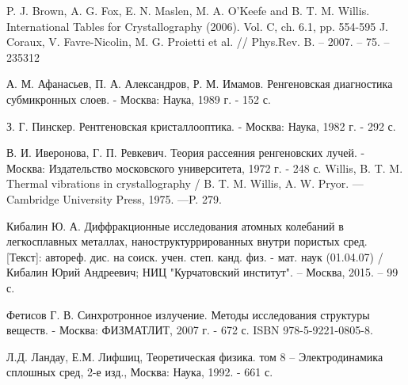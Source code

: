 \begin{thebibliography}{99}

  P. J. Brown, A. G. Fox, E. N. Maslen, M. A. O'Keefe and B. T. M. Willis.
  International Tables for Crystallography (2006). Vol. C, ch. 6.1, pp. 554-595
J. Coraux, V. Favre-Nicolin, M. G. Proietti et al. // Phys.Rev. B. – 2007. – 75. – 235312

  А. М. Афанасьев, П. А. Александров, Р. М. Имамов. Ренгеновская диагностика
  субмикронных слоев. - Москва: Наука, 1989 г. - 152 с.

  З. Г.  Пинскер. Рентгеновская кристаллооптика. - Москва: Наука, 1982 г. - 292 с.

    В. И.  Иверонова, Г. П. Ревкевич. Теория рассеяния ренгеновских лучей. -
    Москва: Издательство московского университета, 1972 г. - 248 с.
  Willis, B. T. M. Thermal vibrations in crystallography /
  B. T. M. Willis, A. W. Pryor. — Cambridge University Press, 1975. —P. 279.

  Кибалин Ю. А. Диффракционные исследования атомных колебаний в легкосплавных
  металлах, наноструктуррированных внутри пористых сред. [Текст]: автореф. дис. на соиск.
   учен. степ. канд. физ. - мат. наук (01.04.07) /
   Кибалин Юрий Андреевич; НИЦ "Курчатовский институт". – Москва, 2015. – 99 с.

  Фетисов Г. В. Синхротронное излучение. Методы исследования структуры веществ. -
  Москва: ФИЗМАТЛИТ, 2007 г. - 672 с. ISBN 978-5-9221-0805-8.

 Л.Д. Ландау, Е.М. Лифшиц, Теоретическая физика. том 8 –
 Электродинамика сплошных сред, 2-е изд., Москва: Наука, 1992. - 661 с.
\end{thebibliography}
